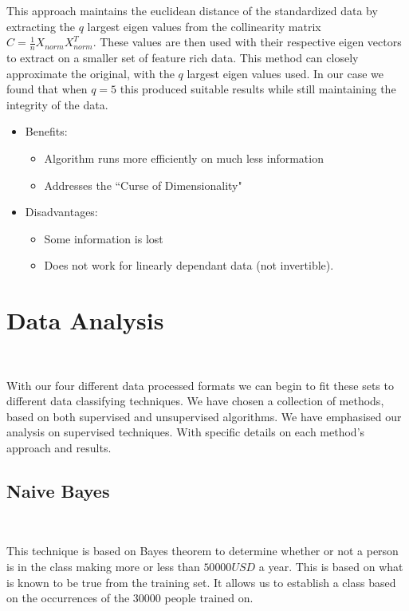 \documentclass{article}
\begin{document}
		This approach maintains the euclidean distance of the standardized data by extracting the $ q $ largest eigen values from the collinearity matrix $ C =\frac{1}{n}X_{norm}X_{norm}^T $. These values are then used with their respective eigen vectors to extract on a smaller set of feature rich data. This method can closely approximate the original, with the $ q $ largest eigen values used. In our case we found that when $ q=5 $ this produced suitable results while still maintaining the integrity of the data.\\
	
	
		
		\begin{itemize}
			\item 	Benefits: 
			\begin{itemize}
				\item Algorithm runs more efficiently on much less information
				\item Addresses the ``Curse of Dimensionality"
			\end{itemize}
			\item  	Disadvantages: 
			\begin{itemize}
				\item Some information is lost
				\item Does not work for linearly dependant data (not invertible).
			\end{itemize}
		\end{itemize}
		
	
	\section{Data Analysis}~
	
	With our four different data processed formats we can begin to fit these sets to different data classifying techniques. We have chosen a collection of methods, based on both supervised and unsupervised algorithms. We have emphasised our analysis on supervised techniques. With specific details on each method's approach and results.
	

	
		\subsection{Naive Bayes}~
		
		This technique is based on Bayes theorem to determine whether or not a person is in the class making more or less than $ 50 000USD$ a year. This is based on what is known to be true from the training set. It allows us to establish a class based on the occurrences of the 30000 people trained on. 
		
\end{document}
